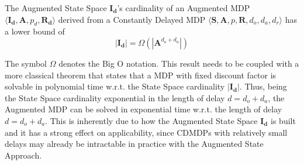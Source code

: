                 \begin{theorem}
                    \label{th:dmdpobscomplexity}
                    The Augmented State Space $\mathbf{I_d}$'s cardinality of an Augmented MDP $\langle \mathbf{I_d}, \mathbf{A}, p_d, \mathbf{R_d} \rangle$ derived from a Constantly Delayed MDP $\langle \mathbf{S}, \mathbf{A}, p, \mathbf{R}, d_o, d_a, d_r \rangle$ has a lower bound of \[ | \mathbf{I_d} | = \Omega \left( | \mathbf{A}^{d_o + d_a} | \right) \]
                \end{theorem}
                \noindent
                The symbol $\Omega$ denotes the Big O notation. This result needs to be coupled with a more classical theorem that states that a MDP with fixed discount factor is solvable in polynomial time w.r.t. the State Space cardinality $| \mathbf{I_d} |$. Thus, being the State Space cardinality exponential in the length of delay $d = d_o + d_a$, the Augmented MDP can be solved in exponential time w.r.t. the length of delay $d = d_o + d_a$. This is inherently due to how the Augmented State Space $\mathbf{I_d}$ is built and it has a strong effect on applicability, since CDMDPs with relatively small delays may already be intractable in practice with the Augmented State Approach.
                
